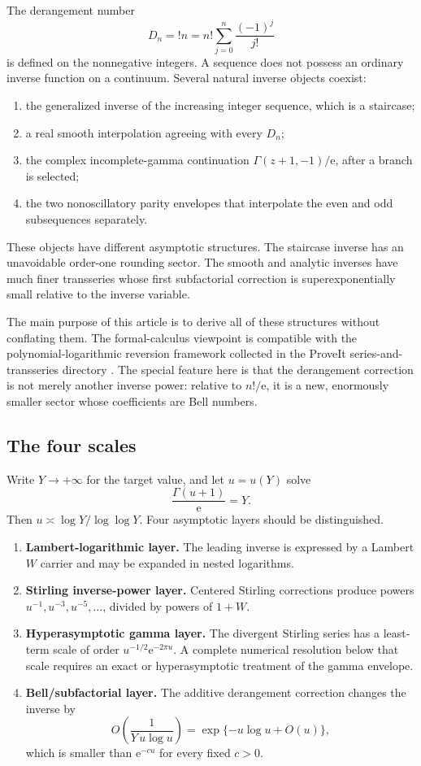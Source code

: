 \documentclass[11pt]{article}
\numberwithin{equation}{section}
\theoremstyle{mainthm}
\theoremstyle{defstyle}
\theoremstyle{remark}
\newcommand{\e}{\mathrm e}
\begin{document}
The derangement number
\[
 D_n=!n=n!\sum_{j=0}^{n}\frac{(-1)^j}{j!}
\]
is defined on the nonnegative integers.  A sequence does not possess an ordinary inverse function on a continuum.  Several natural inverse objects coexist:
\begin{enumerate}
\item the generalized inverse of the increasing integer sequence, which is a staircase;
\item a real smooth interpolation agreeing with every \(D_n\);
\item the complex incomplete-gamma continuation \(\Gamma(z+1,-1)/\e\), after a branch is selected;
\item the two nonoscillatory parity envelopes that interpolate the even and odd subsequences separately.
\end{enumerate}
These objects have different asymptotic structures.  The staircase inverse has an unavoidable order-one rounding sector.  The smooth and analytic inverses have much finer transseries whose first subfactorial correction is superexponentially small relative to the inverse variable.

The main purpose of this article is to derive all of these structures without conflating them.  The formal-calculus viewpoint is compatible with the polynomial-logarithmic reversion framework collected in the ProveIt series-and-transseries directory \cite{ProveItSeries}.  The special feature here is that the derangement correction is not merely another inverse power: relative to \(n!/\e\), it is a new, enormously smaller sector whose coefficients are Bell numbers.

\subsection{The four scales}

Write \(Y\to+\infty\) for the target value, and let \(u=u(Y)\) solve
\[
 \frac{\Gamma(u+1)}{\e}=Y.
\]
Then \(u\asymp \log Y/\log\log Y\).  Four asymptotic layers should be distinguished.

\begin{enumerate}
\item \textbf{Lambert-logarithmic layer.}  The leading inverse is expressed by a Lambert \(W\) carrier and may be expanded in nested logarithms.
\item \textbf{Stirling inverse-power layer.}  Centered Stirling corrections produce powers \(u^{-1},u^{-3},u^{-5},\ldots\), divided by powers of \(1+W\).
\item \textbf{Hyperasymptotic gamma layer.}  The divergent Stirling series has a least-term scale of order \(u^{-1/2}\e^{-2\pi u}\).  A complete numerical resolution below that scale requires an exact or hyperasymptotic treatment of the gamma envelope.
\item \textbf{Bell/subfactorial layer.}  The additive derangement correction changes the inverse by
\[
 O\!\left(\frac{1}{Y\,u\log u}\right)
 =\exp\{-u\log u+O(u)\},
\]
which is smaller than \(\e^{-cu}\) for every fixed \(c>0\).
\end{enumerate}
\end{document}
